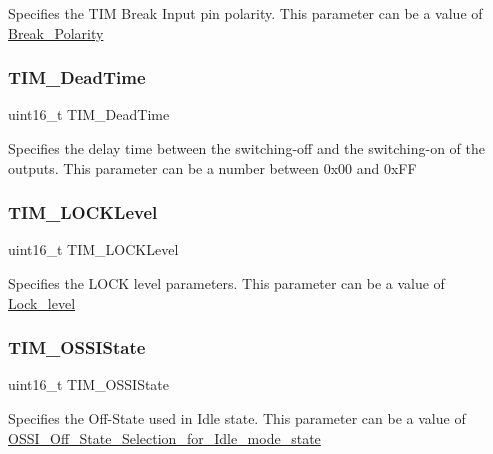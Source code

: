Specifies the T\+IM Break Input pin polarity. This parameter can be a value of \mbox{\hyperlink{group___break___polarity}{Break\+\_\+\+Polarity}} \mbox{\label{struct_t_i_m___b_d_t_r_init_type_def_a136119743510d706b94e605f86b31f82}} 
\subsubsection{\texorpdfstring{TIM\_DeadTime}{TIM\_DeadTime}}
{\footnotesize\ttfamily uint16\+\_\+t T\+I\+M\+\_\+\+Dead\+Time}

Specifies the delay time between the switching-\/off and the switching-\/on of the outputs. This parameter can be a number between 0x00 and 0x\+FF \mbox{\label{struct_t_i_m___b_d_t_r_init_type_def_acba399df603976d328261af5cd9ae011}} 
\subsubsection{\texorpdfstring{TIM\_LOCKLevel}{TIM\_LOCKLevel}}
{\footnotesize\ttfamily uint16\+\_\+t T\+I\+M\+\_\+\+L\+O\+C\+K\+Level}

Specifies the L\+O\+CK level parameters. This parameter can be a value of \mbox{\hyperlink{group___lock__level}{Lock\+\_\+level}} \mbox{\label{struct_t_i_m___b_d_t_r_init_type_def_afc160a2e65a93ea65c81bf05aa6f085d}} 
\subsubsection{\texorpdfstring{TIM\_OSSIState}{TIM\_OSSIState}}
{\footnotesize\ttfamily uint16\+\_\+t T\+I\+M\+\_\+\+O\+S\+S\+I\+State}

Specifies the Off-\/\+State used in Idle state. This parameter can be a value of \mbox{\hyperlink{group___o_s_s_i___off___state___selection__for___idle__mode__state}{O\+S\+S\+I\+\_\+\+Off\+\_\+\+State\+\_\+\+Selection\+\_\+for\+\_\+\+Idle\+\_\+mode\+\_\+state}} \mbox{\label{struct_t_i_m___b_d_t_r_init_type_def_a5d0ca05d766b82cde0a56a6b61c02f8b}} 
